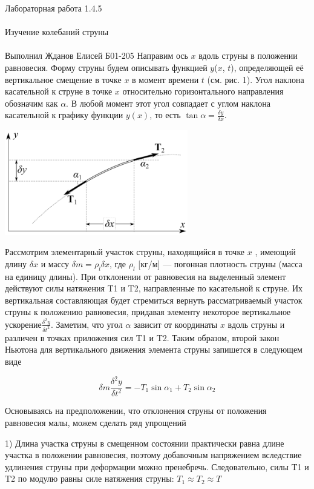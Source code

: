 \documentclass{astroedu-lab}
\begin{document}
\begin{problem}{\huge Лабораторная работа 1.4.5\\\\Изучение колебаний струны\\\\Выполнил Жданов Елисей Б01-205}
Направим ось $x$ вдоль струны в положении равновесия. Форму струны
будем описывать функцией $y$($x$, $t$), определяющей её вертикальное смещение в точке $x$ в момент времени $t$ (см. рис. 1). Угол наклона касательной к струне в точке $x$ относительно горизонтального направления обозначим как $\alpha$. В любой момент этот угол совпадает с углом наклона касательной к графику функции $y(x)$, то есть $\tan{\alpha} = \frac{\delta y}{\delta x}$.
\begin{center}
\includegraphics[width=0.6\textwidth]{theory_1.png}
\label{ris:image}
\end{center}

Рассмотрим элементарный участок струны, находящийся в точке $x$ ,
имеющий длину $\delta x$ и массу $\delta m = \rho_l \delta x$, где $\rho_l$ [кг/м] — погонная плотность струны (масса на единицу длины). При отклонении от равновесия на выделенный элемент действуют силы натяжения T1 и T2, направленные по касательной к струне. Их вертикальная составляющая будет стремиться вернуть рассматриваемый участок струны к положению равновесия, придавая элементу некоторое вертикальное ускорение$\frac{\delta^2 y}{\delta t^2}$. Заметим, что угол $\alpha$ зависит от координаты $x$ вдоль струны и различен в точках приложения сил T1 и T2. Таким образом, второй закон Ньютона для вертикального движения элемента струны запишется в следующем виде

\begin{equation}
	\delta m \frac{\delta^2 y}{\delta t^2} = -T_1 \sin{\alpha_1} + T_2 \sin{\alpha_2}
\end{equation}

Основываясь на предположении, что отклонения струны от положения
равновесия малы, можем сделать ряд упрощений


1) Длина участка струны в смещенном состоянии практически равна
длине участка в положении равновесия, поэтому добавочным
напряжением вследствие удлинения струны при деформации можно пренебречь.  Следовательно, силы T1 и T2 по модулю равны силе
натяжения струны: $T_1 \approx T_2 \approx T$


\end{problem}
\end{document}
